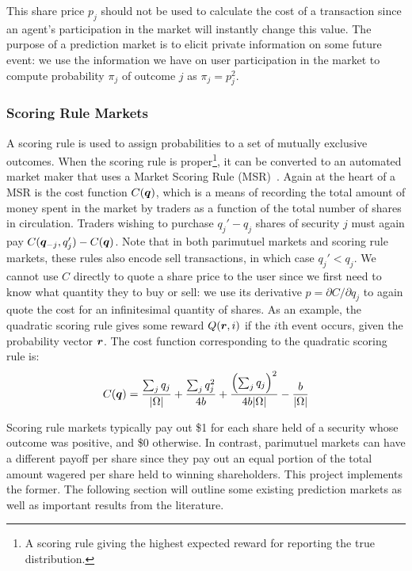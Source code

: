 This share price $p_j$ should not be used to calculate the cost of a
transaction since an agent's participation in the market will instantly change
this value. The purpose of a prediction market is to elicit private information
on some future event: we use the information we have on user participation in
the market to compute probability $\pi_j$ of outcome $j$ as $\pi_j = p_j^2$.

\subsubsection{Scoring Rule Markets}

A scoring rule is used to assign probabilities to a set of mutually exclusive
outcomes. When the scoring rule is proper\footnote{A scoring rule giving the
highest expected reward for reporting the true distribution.}, it can be
converted to an automated market maker that uses a Market Scoring Rule
(MSR)~\cite{Hanson2003}.  Again at the heart of a MSR is the cost function
$C(\bm{q})$, which is a means of recording the total amount of money spent in
the market by traders as a function of the total number of shares in
circulation. Traders wishing to purchase $q_j' - q_j$ shares of security $j$
must again pay $C(\bm{q}_{-j}, q_j')-C(\bm{q})$. Note that in both
parimutuel markets and scoring rule markets, these rules also encode sell
transactions, in which case $q_j' < q_j$. We cannot use $C$ directly to quote a
share price to the user since we first need to know what quantity they to buy
or sell: we use its derivative $p = \partial C / \partial q_j$ to again quote
the cost for an infinitesimal quantity of shares.  As an example, the quadratic
scoring rule gives some reward $Q(\bm{r},i)$ if the $i$th event occurs, given
the probability vector $\bm{r}$. The cost function corresponding to the
quadratic scoring rule is:
%
$$
C(\bm{q}) =
\frac{\sum_j q_j}{|\Omega|} + \frac{\sum_j q_j^2}{4b}  +
\frac{\left( \sum_j q_j \right)^2}{4b|\Omega|} - \frac{b}{|\Omega|}
$$

Scoring rule markets typically pay out \$1 for each share held of a security
whose outcome was positive, and \$0 otherwise. In contrast, parimutuel markets
can have a different payoff per share since they pay out an equal portion of
the total amount wagered per share held to winning shareholders. This project
implements the former. The following section will outline some existing
prediction markets as well as important results from the literature.
